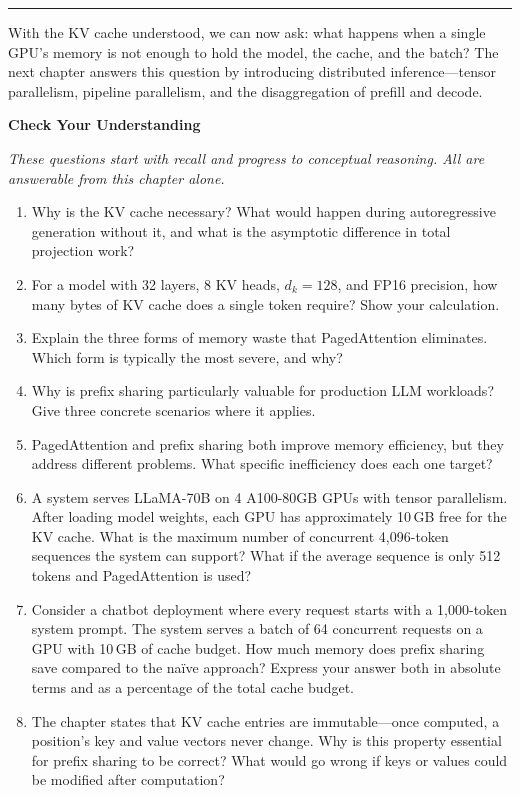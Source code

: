 \medskip
\begin{center}\rule{0.5\linewidth}{0.4pt}\end{center}
\medskip

With the KV cache understood, we can now ask: what happens when a single GPU's memory is not enough to hold the model, the cache, and the batch? The next chapter answers this question by introducing distributed inference---tensor parallelism, pipeline parallelism, and the disaggregation of prefill and decode.

\medskip
\noindent\textbf{Check Your Understanding}

\smallskip
\noindent\emph{These questions start with recall and progress to conceptual reasoning. All are answerable from this chapter alone.}

\begin{enumerate}
  \item Why is the KV cache necessary? What would happen during autoregressive generation without it, and what is the asymptotic difference in total projection work?

  \item For a model with 32 layers, 8 KV heads, $d_k = 128$, and FP16 precision, how many bytes of KV cache does a single token require? Show your calculation.

  \item Explain the three forms of memory waste that PagedAttention eliminates. Which form is typically the most severe, and why?

  \item Why is prefix sharing particularly valuable for production LLM workloads? Give three concrete scenarios where it applies.

  \item PagedAttention and prefix sharing both improve memory efficiency, but they address different problems. What specific inefficiency does each one target?

  \item A system serves LLaMA-70B on 4 A100-80GB GPUs with tensor parallelism. After loading model weights, each GPU has approximately 10\,GB free for the KV cache. What is the maximum number of concurrent 4,096-token sequences the system can support? What if the average sequence is only 512 tokens and PagedAttention is used?

  \item Consider a chatbot deployment where every request starts with a 1,000-token system prompt. The system serves a batch of 64 concurrent requests on a GPU with 10\,GB of cache budget. How much memory does prefix sharing save compared to the na\"ive approach? Express your answer both in absolute terms and as a percentage of the total cache budget.

  \item The chapter states that KV cache entries are immutable---once computed, a position's key and value vectors never change. Why is this property essential for prefix sharing to be correct? What would go wrong if keys or values could be modified after computation?
\end{enumerate}

